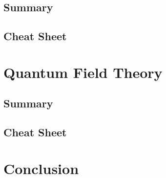 \documentclass[12pt]{book}
\begin{document}
\section{Summary}
\section{Cheat Sheet}

\chapter{Quantum Field Theory}
\section{Summary}
\section{Cheat Sheet}

\chapter{Conclusion}



\end{document}
